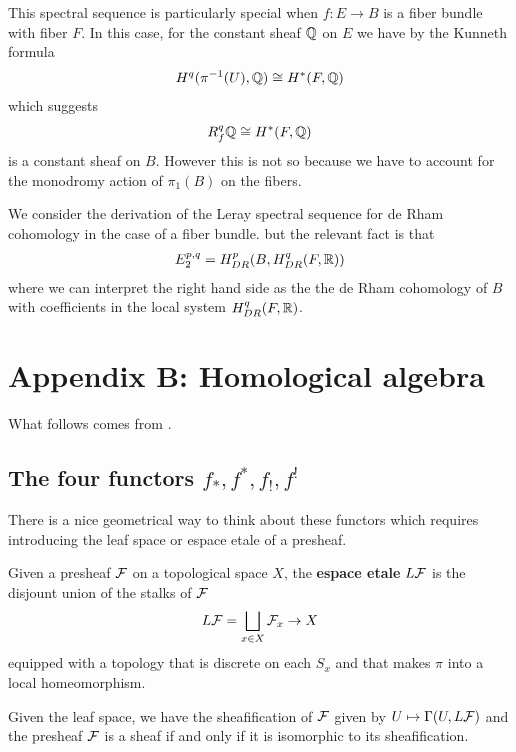 This spectral sequence is particularly special when $f:E\to B$ is a fiber bundle
with fiber $F$. In this case, for the constant sheaf $\mathbb{Q}$ on $E$ we have by
the Kunneth formula \begin{align*}
    H^q(\pi^{-1}(U),\mathbb{Q}) \cong H^*(F,\mathbb{Q})
\end{align*} which suggests \begin{align*}
    R^q_f\mathbb{Q} \cong H^*(F,\mathbb{Q})
\end{align*} is a constant sheaf on $B$. However this is not so 
because we have to account for the monodromy action of $\pi_1(B)$ on the fibers.

\hfill

\begin{example}
    We consider the derivation of the Leray spectral sequence for de Rham cohomology
    in the case of a fiber bundle.
     but the relevant fact is that \begin{align*}
        E_2^{p,q} = H^p_{DR}(B,H^q_{DR}(F,\mathbb{R}))
    \end{align*} where we can interpret the right hand side as 
    the the de Rham cohomology of $B$ with coefficients in the 
    local system $H^q_{DR}(F,\mathbb{R})$.
\end{example}

\section{Appendix B: Homological algebra}
What follows comes from \cite{goresky}.
\subsection{The four functors $f_*,f^*,f_!,f^!$}
There is a nice geometrical way to think about these functors which requires
introducing the leaf space or espace etale of a presheaf.

\begin{definition}
    Given a presheaf ${\mathcal{F}}$ on a topological space $X$, the \textbf{espace etale} $L{\mathcal{F}}$
    is the disjount union of the stalks of ${\mathcal{F}}$ \begin{align*}
        L{\mathcal{F}} = \bigsqcup_{x\in X} {\mathcal{F}}_x \to X
    \end{align*} equipped with a topology that is discrete on each $S_x$ and that makes $\pi$ into 
    a local homeomorphism.
\end{definition}

Given the leaf space, we have the sheafification of ${\mathcal{F}}$ given by $U \mapsto \Gamma(U,L{\mathcal{F}})$
and the presheaf ${\mathcal{F}}$ is a sheaf if and only if it is isomorphic to its sheafification.

